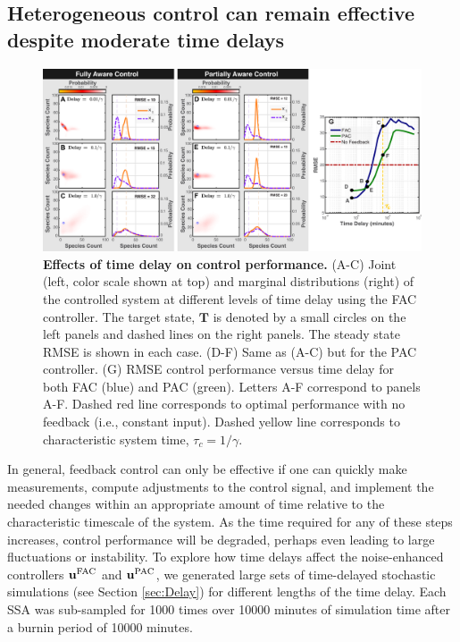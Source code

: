 \documentclass[12pt]{iopart}
\begin{document}
\subsection{Heterogeneous control can remain effective despite moderate time delays}\label{sec:ResTime}
\begin{figure}
\begin{center}
\includegraphics[width=1\textwidth]{TimeDelay.pdf}
\vspace{-0.1in}
\caption{{\bf Effects of time delay on control performance.} (A-C) Joint (left, color scale shown at top) and marginal distributions (right) of the controlled system at different levels of time delay using the FAC controller. The target state, $\mathbf{T}$ is denoted by a small circles on the left panels and dashed lines on the right panels. The steady state RMSE is shown in each case. (D-F) Same as (A-C) but for the PAC controller.  (G) RMSE control performance versus time delay for both FAC (blue) and PAC (green). Letters A-F correspond to panels A-F. Dashed red line corresponds to optimal performance with no feedback (i.e., constant input). Dashed yellow line corresponds to characteristic system time, $\tau_c = 1/\gamma$.}
\label{Time}
\end{center}
\vspace{-0.2in}
\end{figure}

In general, feedback control can only be effective if one can quickly make measurements, compute adjustments to the control signal, and implement the needed changes within an appropriate amount of time relative to the characteristic timescale of the system. As the time required for any of these steps increases, control performance will be degraded, perhaps even leading to large fluctuations or instability. To explore how time delays affect the noise-enhanced controllers $\mathbf{u}^{\rm FAC}$ and $\mathbf{u}^{\rm PAC}$, we generated large sets of time-delayed stochastic simulations (see Section \ref{sec:Delay}) for different lengths of the time delay. Each SSA was sub-sampled for 1000 times over 10000 minutes of simulation time after a burnin period of 10000 minutes.
\end{document}
